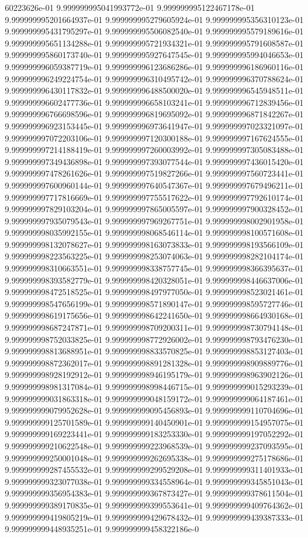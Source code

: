 60223626e-01	9.999999995041993772e-01	9.999999995122467178e-01	9.999999995201664937e-01	9.999999995279605924e-01	9.999999995356310123e-01	9.999999995431795297e-01	9.999999995506082540e-01	9.999999995579189616e-01	9.999999995651134288e-01	9.999999995721934321e-01	9.999999995791608587e-01	9.999999995860173740e-01	9.999999995927647545e-01	9.999999995994046653e-01	9.999999996059387719e-01	9.999999996123686286e-01	9.999999996186960116e-01	9.999999996249224754e-01	9.999999996310495742e-01	9.999999996370788624e-01	9.999999996430117832e-01	9.999999996488500020e-01	9.999999996545948511e-01	9.999999996602477736e-01	9.999999996658103241e-01	9.999999996712839456e-01	9.999999996766698596e-01	9.999999996819695092e-01	9.999999996871842267e-01	9.999999996923153445e-01	9.999999996973641947e-01	9.999999997023321097e-01	9.999999997072203106e-01	9.999999997120300188e-01	9.999999997167624555e-01	9.999999997214188419e-01	9.999999997260003992e-01	9.999999997305083488e-01	9.999999997349436898e-01	9.999999997393077544e-01	9.999999997436015420e-01	9.999999997478261626e-01	9.999999997519827266e-01	9.999999997560723441e-01	9.999999997600960144e-01	9.999999997640547367e-01	9.999999997679496211e-01	9.999999997717816669e-01	9.999999997755517622e-01	9.999999997792610174e-01	9.999999997829103204e-01	9.999999997865005597e-01	9.999999997900328452e-01	9.999999997935079543e-01	9.999999997969267751e-01	9.999999998002901958e-01	9.999999998035992155e-01	9.999999998068546114e-01	9.999999998100571608e-01	9.999999998132078627e-01	9.999999998163073833e-01	9.999999998193566109e-01	9.999999998223563225e-01	9.999999998253074063e-01	9.999999998282104174e-01	9.999999998310663551e-01	9.999999998338757745e-01	9.999999998366395637e-01	9.999999998393582779e-01	9.999999998420328051e-01	9.999999998446637006e-01	9.999999998472518525e-01	9.999999998497977050e-01	9.999999998523021461e-01	9.999999998547656199e-01	9.999999998571890147e-01	9.999999998595727746e-01	9.999999998619175656e-01	9.999999998642241650e-01	9.999999998664930168e-01	9.999999998687247871e-01	9.999999998709200311e-01	9.999999998730794148e-01	9.999999998752033825e-01	9.999999998772926002e-01	9.999999998793476230e-01	9.999999998813688951e-01	9.999999998833570825e-01	9.999999998853127403e-01	9.999999998872362017e-01	9.999999998891281328e-01	9.999999998909889776e-01	9.999999998928192912e-01	9.999999998946195179e-01	9.999999998963902126e-01	9.999999998981317084e-01	9.999999998998446715e-01	9.999999999015293239e-01	9.999999999031863318e-01	9.999999999048159172e-01	9.999999999064187461e-01	9.999999999079952628e-01	9.999999999095456893e-01	9.999999999110704696e-01	9.999999999125701589e-01	9.999999999140450901e-01	9.999999999154957075e-01	9.999999999169223441e-01	9.999999999183253330e-01	9.999999999197052292e-01	9.999999999210622548e-01	9.999999999223968539e-01	9.999999999237093595e-01	9.999999999250001048e-01	9.999999999262695338e-01	9.999999999275178686e-01	9.999999999287455532e-01	9.999999999299529208e-01	9.999999999311401933e-01	9.999999999323077038e-01	9.999999999334558964e-01	9.999999999345851043e-01	9.999999999356954383e-01	9.999999999367873427e-01	9.999999999378611504e-01	9.999999999389170835e-01	9.999999999399553641e-01	9.999999999409764362e-01	9.999999999419805219e-01	9.999999999429678432e-01	9.999999999439387333e-01	9.999999999448935251e-01	9.999999999458322186e-0